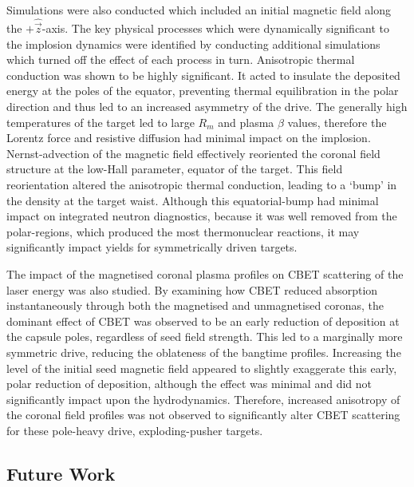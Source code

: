 Simulations were also conducted which included an initial magnetic field along the $+\hat{\vec{z}}$-axis.
The key physical processes which were dynamically significant to the implosion dynamics were identified by conducting additional simulations which turned off the effect of each process in turn.
Anisotropic thermal conduction was shown to be highly significant.
It acted to insulate the deposited energy at the poles of the equator, preventing thermal equilibration in the polar direction and thus led to an increased asymmetry of the drive.
The generally high temperatures of the target led to large $R_m$ and plasma $\beta$ values, therefore the Lorentz force and resistive diffusion had minimal impact on the implosion.
Nernst-advection of the magnetic field effectively reoriented the coronal field structure at the low-Hall parameter, equator of the target.
This field reorientation altered the anisotropic thermal conduction, leading to a `bump' in the density at the target waist.
Although this equatorial-bump had minimal impact on integrated neutron diagnostics, because it was well removed from the polar-regions, which produced the most thermonuclear reactions, it may significantly impact yields for symmetrically driven targets.

The impact of the magnetised coronal plasma profiles on \ac{CBET} scattering of the laser energy was also studied.
By examining how \ac{CBET} reduced absorption instantaneously through both the magnetised and unmagnetised coronas, the dominant effect of \ac{CBET} was observed to be an early reduction of deposition at the capsule poles, regardless of seed field strength.
This led to a marginally more symmetric drive, reducing the oblateness of the bangtime profiles.
Increasing the level of the initial seed magnetic field appeared to slightly exaggerate this early, polar reduction of deposition, although the effect was minimal and did not significantly impact upon the hydrodynamics.
Therefore, increased anisotropy of the coronal field profiles was not observed to significantly alter \ac{CBET} scattering for these pole-heavy drive, exploding-pusher targets.

\subsection{Future Work}%
\label{sec:Res2_future}

